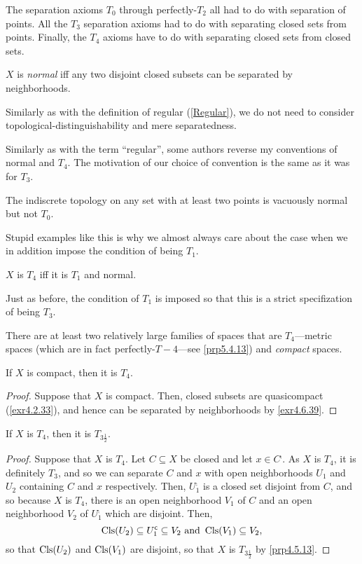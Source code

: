 The separation axioms $T_0$ through perfectly-$T_2$ all had to do with separation of points.  All the $T_3$ separation axioms had to do with separating closed sets from points.  Finally, the $T_4$ axioms have to do with separating closed sets from closed sets.
\begin{dfn}[Normal]\label{Normal}
$X$ is \emph{normal} iff any two disjoint closed subsets can be separated by neighborhoods.
\begin{rmk}
Similarly as with the definition of regular (\cref{Regular}), we do not need to consider topological-distinguishability and mere separatedness.
\end{rmk}
\begin{rmk}
Similarly as with the term ``regular'', some authors reverse my conventions of normal and $T_4$.  The motivation of our choice of convention is the same as it was for $T_3$.
\end{rmk}
\end{dfn}
\begin{exm}
The indiscrete topology on any set with at least two points is vacuously normal but not $T_0$.
\end{exm}
Stupid examples like this is why we almost always care about the case when we in addition impose the condition of being $T_1$.
\begin{dfn}[$T_4$]\label{T4}
$X$ is \emph{$T_4$} iff it is $T_1$ and normal.
\begin{rmk}
Just as before, the condition of $T_1$ is imposed so that this is a strict specifization of being $T_3$.
\end{rmk}
\end{dfn}
There are at least two relatively large families of spaces that are $T_4$---metric spaces (which are in fact perfectly-$T-4$---see \cref{prp5.4.13}) and \emph{compact} spaces.
\begin{prp}\label{prp4.6.83}
If $X$ is compact, then it is $T_4$.
\begin{proof}
Suppose that $X$ is compact.  Then, closed subsets are quasicompact (\cref{exr4.2.33}), and hence can be separated by neighborhoods by \cref{exr4.6.39}.
\end{proof}
\end{prp}
\begin{prp}
If $X$ is $T_4$, then it is $T_{3\frac{1}{2}}$.
\begin{proof}
Suppose that $X$ is $T_4$.  Let $C\subseteq X$ be closed and let $x\in C^{\comp}$.  As $X$ is $T_4$, it is definitely $T_3$, and so we can separate $C$ and $x$ with open neighborhoods $U_1$ and $U_2$ containing $C$ and $x$ respectively.  Then, $U_1^{\comp}$ is a closed set disjoint from $C$, and so because $X$ is $T_4$, there is an open neighborhood $V_1$ of $C$ and an open neighborhood $V_2$ of $U_1^{\comp}$ which are disjoint.  Then,
\begin{equation}
\operatorname{Cls} (U_2)\subseteq U_1^{\mathsf{c}}\subseteq V_2\text{ and }\operatorname{Cls} (V_1)\subseteq V_2,
\end{equation}
so that $\operatorname{Cls} (U_2)$ and $\operatorname{Cls} (V_1)$ are disjoint, so that $X$ is $T_{3\frac{1}{2}}$ by \cref{prp4.5.13}.
\end{proof}
\end{prp}
